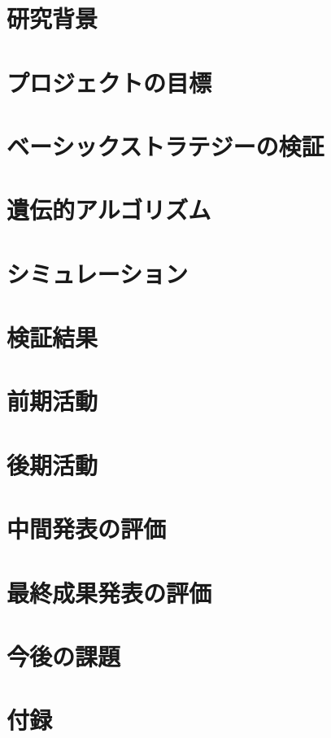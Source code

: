 \documentclass[11pt,a4paper,oneside]{jsbook}
\begin{document}
\tableofcontents
\newpage


\chapter{研究背景}





\chapter{プロジェクトの目標}

\chapter{ベーシックストラテジーの検証}


\chapter{遺伝的アルゴリズム}


\chapter{シミュレーション}


\chapter{検証結果}



\chapter{前期活動}

%
\chapter{後期活動}

\chapter{中間発表の評価}

\chapter{最終成果発表の評価}

\chapter{今後の課題}




\chapter{付録}


%
%
%
\end{document}
